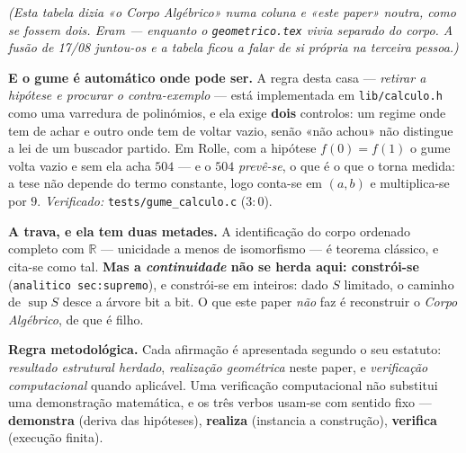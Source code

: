 \documentclass[11pt,a4paper]{article}
\newcommand{\code}[1]{\texttt{\small #1}}
\begin{document}
\noindent\emph{(Esta tabela dizia «o \emph{Corpo Algébrico}» numa coluna e «este paper»
noutra, como se fossem dois. Eram --- enquanto o \code{geometrico.tex} vivia separado do
corpo. A fusão de 17/08 juntou-os e a tabela ficou a falar de si própria na terceira
pessoa.)}

\noindent\textbf{E o gume é automático onde pode ser.} A regra desta casa ---
\emph{retirar a hipótese e procurar o contra-exemplo} --- está implementada em
\code{lib/calculo.h} como uma varredura de polinómios, e ela exige \textbf{dois}
controlos: um regime onde tem de achar e outro onde tem de voltar vazio, senão «não
achou» não distingue a lei de um buscador partido. Em Rolle, com a hipótese
$f(0)=f(1)$ o gume volta vazio e sem ela acha $504$ --- e o $504$ \emph{prevê-se}, o
que é o que o torna medida: a tese não depende do termo constante, logo conta-se em
$(a,b)$ e multiplica-se por $9$. \emph{Verificado:} \code{tests/gume\_calculo.c}
($3{:}0$).

\medskip
\noindent\textbf{A trava, e ela tem duas metades.} A identificação do corpo
ordenado completo com $\mathbb{R}$ --- unicidade a menos de isomorfismo --- é
teorema clássico, e cita-se como tal. \textbf{Mas a \emph{continuidade} não se
herda aqui: constrói-se} (\code{analitico sec:supremo}), e constrói-se em inteiros: dado
$S$ limitado, o caminho de $\sup S$ desce a árvore bit a bit. O que este paper
\emph{não} faz é reconstruir o \emph{Corpo Algébrico}, de que é filho.

\medskip
\noindent\textbf{Regra metodológica.} Cada afirmação é apresentada segundo o seu
estatuto: \emph{resultado estrutural herdado}, \emph{realização geométrica} neste
paper, e \emph{verificação computacional} quando aplicável. Uma verificação
computacional não substitui uma demonstração matemática, e os três verbos usam-se
com sentido fixo --- \textbf{demonstra} (deriva das hipóteses), \textbf{realiza}
(instancia a construção), \textbf{verifica} (execução finita).
\end{document}
